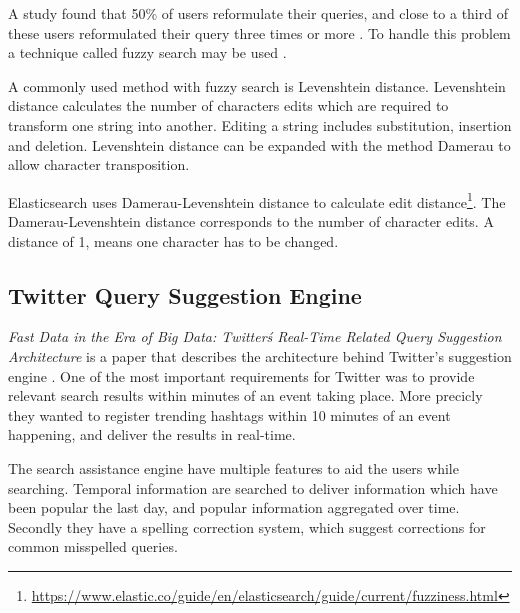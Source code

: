 A study found that 50\% of users reformulate their queries, and close to a third of these users reformulated their query three times or more \cite{query-reformulate}.
To handle this problem a technique called fuzzy search may be used \cite{fuzzy-search}.

A commonly used method with fuzzy search is Levenshtein distance.
Levenshtein distance calculates the number of characters edits which are required to transform one string into another.
Editing a string includes substitution, insertion and deletion.
Levenshtein distance can be expanded with the method Damerau to allow character transposition.

Elasticsearch uses Damerau-Levenshtein distance to calculate edit distance\footnote{\url{https://www.elastic.co/guide/en/elasticsearch/guide/current/fuzziness.html}}.
The Damerau-Levenshtein distance corresponds to the number of character edits.
A distance of 1, means one character has to be changed.

\subsection{Twitter Query Suggestion Engine}
\textit{Fast Data in the Era of Big Data: Twitter\'s Real-Time Related Query Suggestion Architecture} is a paper that describes the architecture behind Twitter's suggestion engine \cite{twitter-suggestion}.
One of the most important requirements for Twitter was to provide relevant search results within minutes of an event taking place.
More precicly they wanted to register trending hashtags within 10 minutes of an event happening, and deliver the results in real-time.

The search assistance engine have multiple features to aid the users while searching.
Temporal information are searched to deliver information which have been popular the last day, and popular information aggregated over time.
Secondly they have a spelling correction system, which suggest corrections for common misspelled queries.


\cleardoublepage
